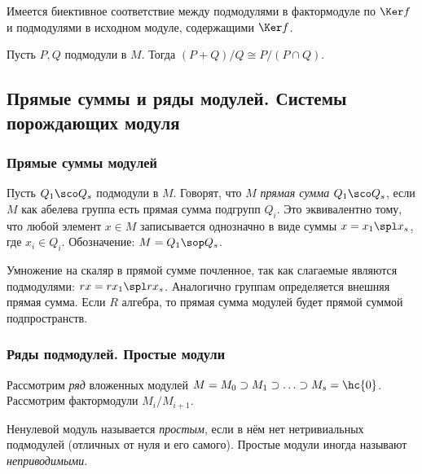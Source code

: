 \documentclass[a4paper]{article}
\begin{document}
\begin{theorem}[О соответствии]
Имеется биективное соответствие между подмодулями в фактормодуле по $\Ker f$ и подмодулями в исходном
модуле, содержащими $\Ker f$.
\end{theorem}

\begin{theorem}[Об изоморфизме]
Пусть $P,Q$ подмодули в $M$. Тогда $(P+Q)/Q\cong P/(P\cap Q)$.
\end{theorem}

\subsection{Прямые суммы и ряды модулей. Системы порождающих модуля}

\subsubsection{Прямые суммы модулей}

\begin{df}
Пусть $Q_1 \sco Q_s$ подмодули в $M$. Говорят, что $M$ \emph{прямая сумма} $Q_1 \sco Q_s$,  если
$M$ как абелева группа есть прямая сумма подгрупп $Q_i$. Это эквивалентно тому, что любой элемент $x \in M$
записывается однозначно в виде суммы $x=x_1  \spl  x_s$, где $x_i \in Q_i$. Обозначение: $M= Q_1 \sop Q_s$.
\end{df}
Умножение на скаляр в прямой сумме почленное, так как слагаемые являются подмодулями:  $rx=rx_1  \spl  rx_s$.
Аналогично группам определяется внешняя прямая сумма. Если $R$ алгебра, то прямая сумма модулей будет
прямой суммой подпространств.

\subsubsection{Ряды подмодулей. Простые модули}

Рассмотрим \emph{\emph{ряд}} вложенных модулей $M=M_0 \supset M_1 \supset \ldots \supset M_s = \hc{0}$.
Рассмотрим фактормодули $M_i/M_{i+1}$.

\begin{df}
Ненулевой модуль называется \emph{простым}, если в нём нет нетривиальных подмодулей (отличных от  нуля и
его самого). Простые модули иногда называют \emph{неприводимыми}.
\end{df}
\end{document}
